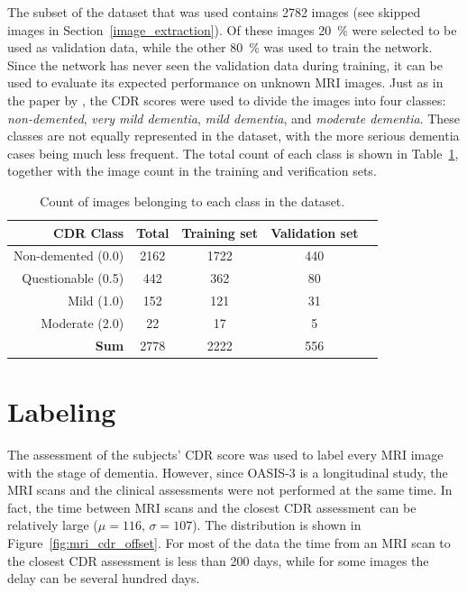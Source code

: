 \documentclass{kththesis}
\begin{document}
The subset of the dataset that was used contains 2782 images (see skipped images in Section~\ref{image_extraction}). Of these images 20~\% were selected to be used as validation data, while the other 80~\% was used to train the network. Since the network has never seen the validation data during training, it can be used to evaluate its expected performance on unknown MRI images. Just as in the paper by \textcite{islam2018early}, the CDR scores were used to divide the images into four classes: \textit{non-demented}, \textit{very mild dementia}, \textit{mild dementia}, and \textit{moderate dementia}. These classes are not equally represented in the dataset, with the more serious dementia cases being much less frequent. The total count of each class is shown in Table~\ref{tab:dataset_contents}, together with the image count in the training and verification sets.

\begin{table}[h]
  \begin{center}
    \caption{Count of images belonging to each class in the dataset.\label{tab:dataset_contents}}
    \begin{tabular}{r|cccc}
      \textbf{CDR Class} & \textbf{Total} & \textbf{Training set} & \textbf{Validation set} \\
      \toprule
      Non-demented (0.0) & 2162 & 1722 & 440 \\
      Questionable (0.5) & 442 & 362 & 80 \\
      Mild (1.0) & 152 & 121 & 31 \\
      Moderate (2.0) & 22 & 17 & 5 \\
      \bottomrule
      \textbf{Sum} & 2778 & 2222 & 556 \\
    \end{tabular}
  \end{center}
\end{table}

\section{Labeling}
The assessment of the subjects' CDR score was used to label every MRI image with the stage of dementia. However, since OASIS-3 is a longitudinal study, the MRI scans and the clinical assessments were not performed at the same time. In fact, the time between MRI scans and the closest CDR assessment can be relatively large ($\mu=116$, $\sigma=107$). The distribution is shown in Figure~\ref{fig:mri_cdr_offset}. For most of the data the time from an MRI scan to the closest CDR assessment is less than 200 days, while for some images the delay can be several hundred days.
\end{document}

